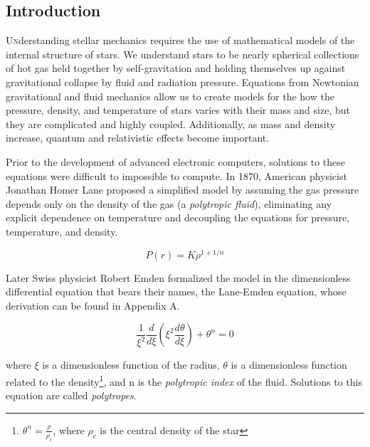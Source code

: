 \documentclass[twoside]{article}
\begin{document}
\begin{multicols}{2} %

\section{Introduction}

\lettrine[nindent=0em,lines=2]{U}nderstanding stellar mechanics requires the use
of mathematical models of the internal structure of stars. We understand stars
to be nearly spherical collections of hot gas held together by self-gravitation
and holding themselves up against gravitational collapse by fluid and radiation
pressure. Equations from Newtonian gravitational and fluid mechanics allow us to
create models for the how the pressure, density, and temperature of stars varies
with their mass and size, but they are complicated and highly
coupled.\cite{hansen2004} Additionally, as mass and density increase, quantum
and relativistic effects become important.

Prior to the development of advanced electronic computers, solutions to these
equations were difficult to impossible to compute. In 1870, American physicist
Jonathan Homer Lane proposed a simplified model\cite{lane1870} by assuming the
gas pressure depends only on the density of the gas (a \emph{polytropic fluid}),
eliminating any explicit dependence on temperature and decoupling the equations
for pressure, temperature, and density.

    \begin{equation}
        \label{eq:polystate}
        P(r) = K\rho^{1+1/n}
    \end{equation}
    
Later Swiss physicist Robert Emden formalized the model in the dimensionless
differential equation that bears their names, the Lane-Emden equation, whose
derivation can be found in Appendix A.

    \begin{equation}
        \label{eq:le}
        \frac{1}{\xi^2}\frac{d}{d\xi}\left(\xi^2\frac{d\theta}{d\xi}\right)+\theta^n=0
    \end{equation}

where \(\xi\) is a dimensionless function of the radius, \(\theta\) is a
dimensionless function related to the
density\footnote{\(\theta^n=\frac{\rho}{\rho_c}\), where \(\rho_c\) is the
central density of the star}, and n is the \emph{polytropic
index} of the fluid.  Solutions to this equation are called \emph{polytropes}.


\end{multicols}
\end{document}
